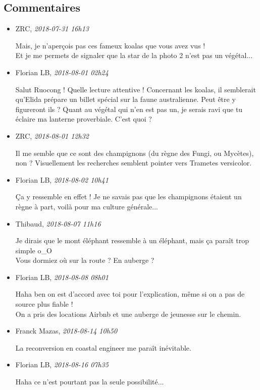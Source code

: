 \documentclass[]{article}
\date{}
\begin{document}
\hypertarget{commentaires}{%
\subsection{Commentaires}\label{commentaires}}

\begin{itemize}
\item
  ZRC, \emph{2018-07-31 16h13}

  Mais, je n'aperçois pas ces fameux koalas que vous avez vus !\\
  Et je me permets de signaler que la star de la photo 2 n'est pas un
  végétal...
\item
  Florian LB, \emph{2018-08-01 02h24}

  Salut Ruocong ! Quelle lecture attentive ! Concernant les koalas, il
  semblerait qu'Elida prépare un billet spécial sur la faune
  australienne. Peut être y figureront ils ? Quant au végétal qui n'en
  est pas un, je serais ravi que tu éclaire ma lanterne proverbiale.
  C'est quoi ?
\item
  ZRC, \emph{2018-08-01 12h32}

  Il me semble que ce sont des champignons (du règne des Fungi, ou
  Mycètes), non ? Visuellement les recherches semblent pointer vers
  Trametes versicolor.
\item
  Florian LB, \emph{2018-08-02 10h41}

  Ça y ressemble en effet ! Je ne savais pas que les champignons étaient
  un règne à part, voilà pour ma culture générale...
\item
  Thibaud, \emph{2018-08-07 11h16}

  Je dirais que le mont éléphant ressemble à un éléphant, mais ça paraît
  trop simple o\_O\\
  Vous dormiez où sur la route ? En auberge ?
\item
  Florian LB, \emph{2018-08-08 08h01}

  Haha ben on est d'accord avec toi pour l'explication, même si on a pas
  de source plus fiable !\\
  On a pris des locations Airbnb et une auberge de jeunesse sur le
  chemin.
\item
  Franck Mazas, \emph{2018-08-14 10h50}

  La reconversion en coastal engineer me paraît inévitable.
\item
  Florian LB, \emph{2018-08-16 07h35}

  Haha ce n'est pourtant pas la seule possibilité...
\end{itemize}
\end{document}
